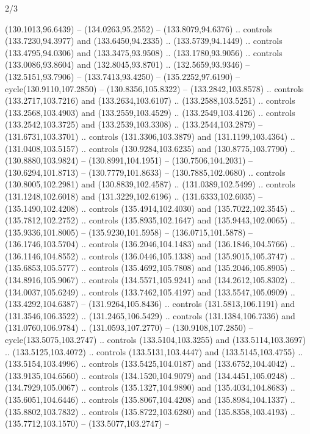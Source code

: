 \begin{flagdescription}{2/3}
\begin{scope}[scale=0.00214\flagwidth,yshift=164.5mm]
\begin{scope}[y=-0.8pt, x=0.8pt, inner sep=0pt, outer sep=0pt]
\begin{scope}[fill=black]
  (130.1013,96.6439) -- (134.0263,95.2552) -- (133.8079,94.6376) .. controls
  (133.7230,94.3977) and (133.6450,94.2335) .. (133.5739,94.1449) .. controls
  (133.4795,94.0306) and (133.3475,93.9508) .. (133.1780,93.9056) .. controls
  (133.0086,93.8604) and (132.8045,93.8701) .. (132.5659,93.9346) --
  (132.5151,93.7906) -- (133.7413,93.4250) -- (135.2252,97.6190) --
  cycle(130.9110,107.2850) -- (130.8356,105.8322) -- (133.2842,103.8578) ..
  controls (133.2717,103.7216) and (133.2634,103.6107) .. (133.2588,103.5251) ..
  controls (133.2568,103.4903) and (133.2559,103.4529) .. (133.2549,103.4126) ..
  controls (133.2542,103.3725) and (133.2539,103.3308) .. (133.2544,103.2879) --
  (131.6731,103.3701) .. controls (131.3306,103.3879) and (131.1199,103.4364) ..
  (131.0408,103.5157) .. controls (130.9284,103.6235) and (130.8775,103.7790) ..
  (130.8880,103.9824) -- (130.8991,104.1951) -- (130.7506,104.2031) --
  (130.6294,101.8713) -- (130.7779,101.8633) -- (130.7885,102.0680) .. controls
  (130.8005,102.2981) and (130.8839,102.4587) .. (131.0389,102.5499) .. controls
  (131.1248,102.6018) and (131.3229,102.6196) .. (131.6333,102.6035) --
  (135.1490,102.4208) .. controls (135.4914,102.4030) and (135.7022,102.3545) ..
  (135.7812,102.2752) .. controls (135.8935,102.1647) and (135.9443,102.0065) ..
  (135.9336,101.8005) -- (135.9230,101.5958) -- (136.0715,101.5878) --
  (136.1746,103.5704) .. controls (136.2046,104.1483) and (136.1846,104.5766) ..
  (136.1146,104.8552) .. controls (136.0446,105.1338) and (135.9015,105.3747) ..
  (135.6853,105.5777) .. controls (135.4692,105.7808) and (135.2046,105.8905) ..
  (134.8916,105.9067) .. controls (134.5571,105.9241) and (134.2612,105.8302) ..
  (134.0037,105.6249) .. controls (133.7462,105.4197) and (133.5547,105.0909) ..
  (133.4292,104.6387) -- (131.9264,105.8436) .. controls (131.5813,106.1191) and
  (131.3546,106.3522) .. (131.2465,106.5429) .. controls (131.1384,106.7336) and
  (131.0760,106.9784) .. (131.0593,107.2770) -- (130.9108,107.2850) --
  cycle(133.5075,103.2747) .. controls (133.5104,103.3255) and
  (133.5114,103.3697) .. (133.5125,103.4072) .. controls (133.5131,103.4447) and
  (133.5145,103.4755) .. (133.5154,103.4996) .. controls (133.5425,104.0187) and
  (133.6752,104.4042) .. (133.9135,104.6560) .. controls (134.1520,104.9079) and
  (134.4451,105.0248) .. (134.7929,105.0067) .. controls (135.1327,104.9890) and
  (135.4034,104.8683) .. (135.6051,104.6446) .. controls (135.8067,104.4208) and
  (135.8984,104.1337) .. (135.8802,103.7832) .. controls (135.8722,103.6280) and
  (135.8358,103.4193) .. (135.7712,103.1570) -- (133.5077,103.2747) --

\end{scope}
\end{scope}
\end{scope}
\end{flagdescription}

